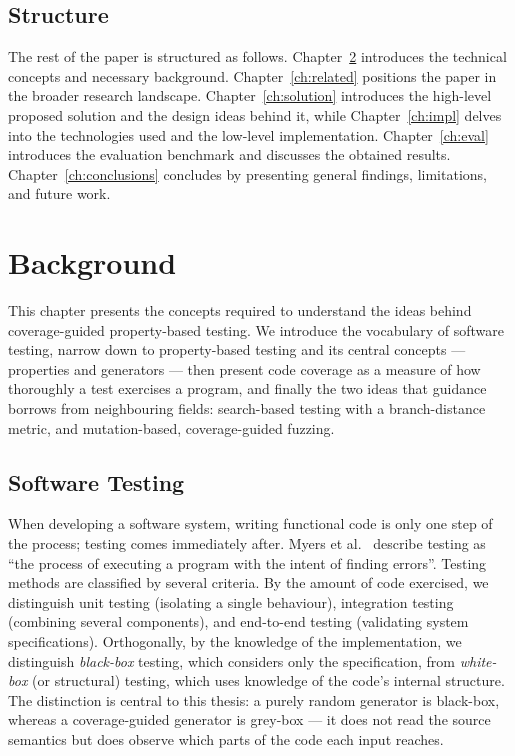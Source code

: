 \documentclass[11pt,a4paper]{report}
\begin{document}
\section{Structure}
\label{sec:structure}

The rest of the paper is structured as follows. Chapter~\ref{ch:background} introduces the technical
concepts and necessary background. Chapter~\ref{ch:related} positions the paper in the broader research
landscape. Chapter~\ref{ch:solution} introduces the high-level proposed solution and the design ideas
behind it, while Chapter~\ref{ch:impl} delves into the technologies used and the low-level implementation.
Chapter~\ref{ch:eval} introduces the evaluation benchmark and discusses the obtained results.
Chapter~\ref{ch:conclusions} concludes by presenting general findings, limitations, and future work.

\chapter{Background}
\label{ch:background}

This chapter presents the concepts required to understand the ideas behind coverage-guided property-based
testing. We introduce the vocabulary of software testing, narrow down to property-based testing and its
central concepts — properties and generators — then present code coverage as a measure of how thoroughly a
test exercises a program, and finally the two ideas that guidance borrows from neighbouring fields: search-based
testing with a branch-distance metric, and mutation-based, coverage-guided fuzzing.

\section{Software Testing}
\label{sec:testing}

When developing a software system, writing functional code is only one step of the process; testing comes
immediately after. Myers et al.~\cite{myers} describe testing as ``the process of executing a program with
the intent of finding errors''. Testing methods are classified by several criteria. By the amount of code
exercised, we distinguish unit testing (isolating a single behaviour), integration testing (combining
several components), and end-to-end testing (validating system specifications). Orthogonally, by the
knowledge of the implementation, we distinguish \emph{black-box} testing, which considers only the
specification, from \emph{white-box} (or structural) testing, which uses knowledge of the code's internal
structure. The distinction is central to this thesis: a purely random generator is black-box, whereas a
coverage-guided generator is grey-box — it does not read the source semantics but does observe which parts
of the code each input reaches.
\end{document}
